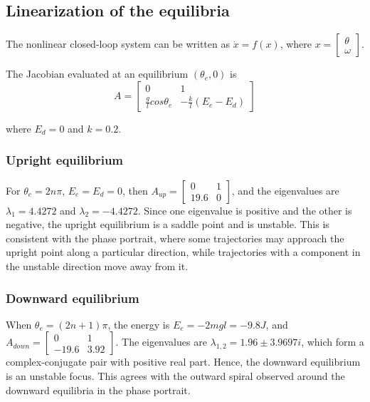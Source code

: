 \documentclass[12pt]{article}
\begin{document}
\subsection{Linearization of the equilibria}

The nonlinear closed-loop system can be written as $\dot{x}=f(x)$, where $x=\begin{bmatrix}\theta \\ \omega\end{bmatrix}$.

The Jacobian evaluated at an equilibrium $(\theta_e, 0)$ is
$$
A = \begin{bmatrix}
0 & 1 \\
\frac{g}{l}cos\theta_e & -\frac{k}{l}(E_e-E_d)
\end{bmatrix}
$$

where $E_d=0$ and $k=0.2$.

\subsubsection{Upright equilibrium}

For $\theta_e = 2n\pi$, $E_e = E_d = 0$, then $A_{up} = \begin{bmatrix}
    0 & 1 \\ 19.6 & 0
\end{bmatrix}$, and the eigenvalues are $\lambda_1 = 4.4272$ and $\lambda_2 = -4.4272$. Since one eigenvalue is positive and the other is negative, the upright equilibrium is a saddle point and is unstable. This is consistent with the phase portrait, where some trajectories may approach the upright point along a particular direction, while trajectories with a component in the unstable direction move away from it.

\subsubsection{Downward equilibrium}

When $\theta_e = (2n+1)\pi$, the energy is $E_e = -2mgl = -9.8J$, and $A_{down} = \begin{bmatrix}
    0 & 1 \\ -19.6 & 3.92
\end{bmatrix}$. The eigenvalues are $\lambda_{1,2} = 1.96 \pm 3.9697i$, which form a complex-conjugate pair with positive real part. Hence, the downward equilibrium is an unstable focus. This agrees with the outward spiral observed around the downward equilibria in the phase portrait.
\end{document}
